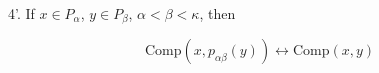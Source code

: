 4'. If $x \in P_\alpha$, $y \in P_\beta$, $\alpha < \beta < \kappa$, then

$$\text{Comp}(x, p_{\alpha\beta}(y)) \leftrightarrow \text{Comp}(x, y)$$
